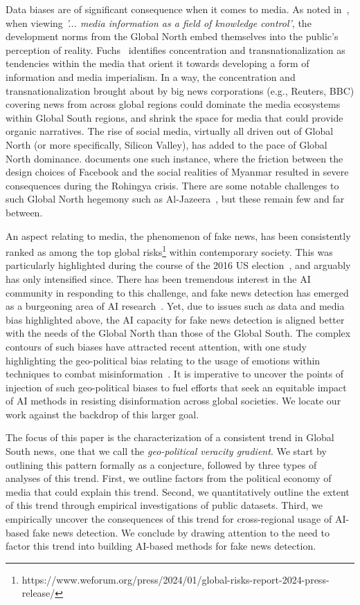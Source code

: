 \documentclass[runningheads]{llncs}
\begin{document}
Data biases are of significant consequence when it comes to media. As noted in~\cite{rambaldi2022review}, when viewing {\it '... media information as a field of knowledge control'}, the development norms from the Global North embed themselves into the public's perception of reality. Fuchs~\cite{fuchs2010new} identifies concentration and transnationalization as tendencies within the media that orient it towards developing a form of information and media imperialism. In a way, the concentration and transnationalization brought about by big news corporations (e.g., Reuters, BBC) covering news from across global regions could dominate the media ecosystems within Global South regions, and shrink the space for media that could provide organic narratives. The rise of social media, virtually all driven out of Global North (or more specifically, Silicon Valley), has added to the pace of Global North dominance. \cite{chinmayi2020ai} documents one such instance, where the friction between the design choices of Facebook and the social realities of Myanmar resulted in severe consequences during the Rohingya crisis. There are some notable challenges to such Global North hegemony such as Al-Jazeera~\cite{seib2005hegemonic}, but these remain few and far between.  

An aspect relating to media, the phenomenon of fake news, has been consistently ranked as among the top global risks\footnote{https://www.weforum.org/press/2024/01/global-risks-report-2024-press-release/} within contemporary society. This was particularly highlighted during the course of the 2016 US election~\cite{grinberg2019fake}, and arguably has only intensified since. There has been tremendous interest in the AI community in responding to this challenge, and fake news detection has emerged as a burgeoning area of AI research~\cite{iqbal2023relationship}. Yet, due to issues such as data and media bias highlighted above, the AI capacity for fake news detection is aligned better with the needs of the Global North than those of the Global South. The complex contours of such biases have attracted recent attention, with one study highlighting the geo-political bias relating to the usage of emotions within techniques to combat misinformation~\cite{deepak2024geo}. It is imperative to uncover the points of injection of such geo-political biases to fuel efforts that seek an equitable impact of AI methods in resisting disinformation across global societies. We locate our work against the backdrop of this larger goal. 

The focus of this paper is the characterization of a consistent trend in Global South news, one that we call the {\it geo-political veracity gradient}. We start by outlining this pattern formally as a conjecture, followed by three types of analyses of this trend. First, we outline factors from the political economy of media that could explain this trend. Second, we quantitatively outline the extent of this trend through empirical investigations of public datasets. Third, we empirically uncover the consequences of this trend for cross-regional usage of AI-based fake news detection. We conclude by drawing attention to the need to factor this trend into building AI-based methods for fake news detection. 
\end{document}
